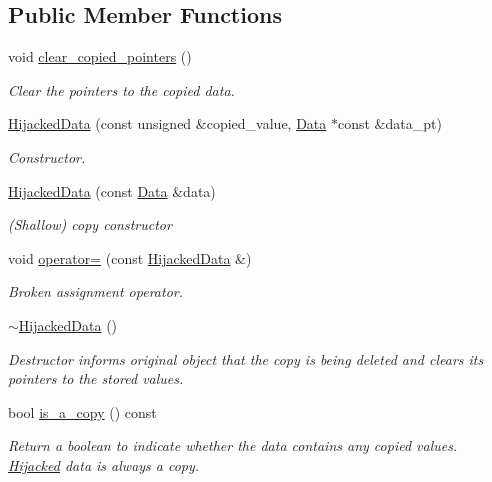 \subsection*{Public Member Functions}
\begin{DoxyCompactItemize}
\item 
void \hyperlink{classoomph_1_1HijackedData_aff8443f8455e18b3893c094326c4d212}{clear\+\_\+copied\+\_\+pointers} ()
\begin{DoxyCompactList}\small\item\em Clear the pointers to the copied data. \end{DoxyCompactList}\item 
\hyperlink{classoomph_1_1HijackedData_a7c9c9735ad6199fdf2e9a341559d45cc}{Hijacked\+Data} (const unsigned \&copied\+\_\+value, \hyperlink{classoomph_1_1Data}{Data} $\ast$const \&data\+\_\+pt)
\begin{DoxyCompactList}\small\item\em Constructor. \end{DoxyCompactList}\item 
\hyperlink{classoomph_1_1HijackedData_a8f8c054b84f8f27443dea6094d7e9ce8}{Hijacked\+Data} (const \hyperlink{classoomph_1_1Data}{Data} \&data)
\begin{DoxyCompactList}\small\item\em (Shallow) copy constructor \end{DoxyCompactList}\item 
void \hyperlink{classoomph_1_1HijackedData_a4e499c40d950eb025f5584070ea9f3a1}{operator=} (const \hyperlink{classoomph_1_1HijackedData}{Hijacked\+Data} \&)
\begin{DoxyCompactList}\small\item\em Broken assignment operator. \end{DoxyCompactList}\item 
\hyperlink{classoomph_1_1HijackedData_a62d4c2d9f9dc30750c7a2fb414de2174}{$\sim$\+Hijacked\+Data} ()
\begin{DoxyCompactList}\small\item\em Destructor informs original object that the copy is being deleted and clears its pointers to the stored values. \end{DoxyCompactList}\item 
bool \hyperlink{classoomph_1_1HijackedData_ad392e7561212e3196d05a35417697112}{is\+\_\+a\+\_\+copy} () const
\begin{DoxyCompactList}\small\item\em Return a boolean to indicate whether the data contains any copied values. \hyperlink{classoomph_1_1Hijacked}{Hijacked} data is always a copy. \end{DoxyCompactList}\item 

\end{DoxyCompactItemize}
